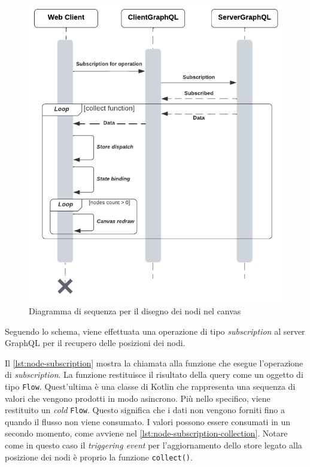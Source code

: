 \begin{figure}[htb]
	\centering
	\includegraphics[scale=0.8]{imgs/Sequenza_rendering_plus.pdf}
	\caption{Diagramma di sequenza per il disegno dei nodi nel canvas}
	\label{fig:sequence-rendering-advance}
\end{figure}
Seguendo lo schema, viene effettuata una operazione di tipo \textit{subscription} al server GraphQL per il recupero delle posizioni dei nodi. 

Il \cref{lst:node-subscription} mostra la chiamata alla funzione che esegue l'operazione di \textit{subscription}. La funzione restituisce il risultato della query come un oggetto di tipo \texttt{Flow}. Quest'ultima è una classe di Kotlin che rappresenta una sequenza di valori che vengono prodotti in modo asincrono. Più nello specifico, viene restituito un \textit{cold} \texttt{Flow}. Questo significa che i dati non vengono forniti  fino a quando il flusso non viene consumato. I valori possono essere consumati in un secondo momento, come avviene nel  \cref{lst:node-subscription-collection}. Notare come in questo caso il \textit{triggering event} per l'aggiornamento dello store legato alla posizione dei nodi è proprio la funzione \texttt{collect()}.

 
